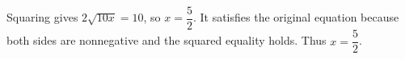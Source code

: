 Squaring gives $2\sqrt{10x}=10$, so $x=\dfrac{5}{2}$. It satisfies the original equation because both sides are nonnegative and the squared equality holds. Thus $\boxed{x=\dfrac{5}{2}}$.
